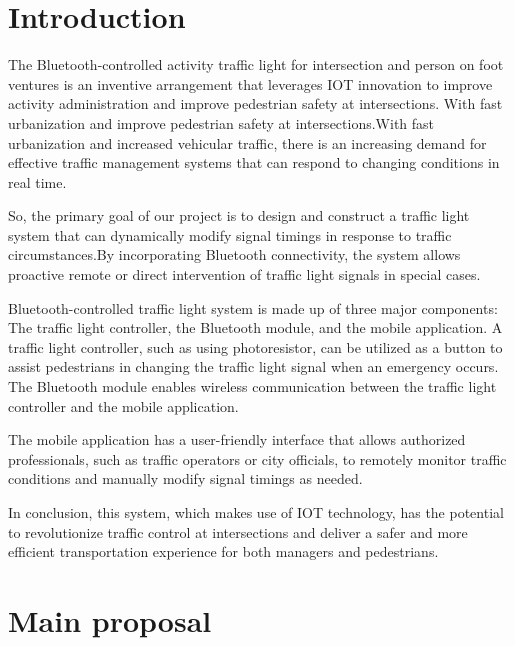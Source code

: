 \documentclass[conference, onecolumn]{IEEEtran}
\begin{document}
\section {\textbf{Introduction}}
The Bluetooth-controlled activity traffic light for intersection and person on foot ventures is an inventive arrangement that leverages IOT innovation to improve activity administration and improve pedestrian safety at intersections. With fast urbanization and improve pedestrian safety at intersections.With fast urbanization and increased vehicular traffic, there is an increasing demand for effective traffic management systems that can respond to changing conditions in real time.\par

So, the primary goal of our project is to design and construct a traffic light system that can dynamically modify signal timings in response to traffic circumstances.By incorporating Bluetooth connectivity, the system allows proactive remote or direct intervention of traffic light signals in special cases.\par

Bluetooth-controlled traffic light system is made up of three major components: The traffic light controller, the Bluetooth module, and the mobile application. A traffic light controller, such as using photoresistor, can be utilized as a button to assist pedestrians in changing the traffic light signal when an emergency occurs. The Bluetooth module enables wireless communication between the traffic light controller and the mobile application.\par
The mobile application has a user-friendly interface that allows authorized professionals, such as traffic operators or city officials, to remotely monitor traffic conditions and manually modify signal timings as needed.\par


In conclusion, this system, which makes use of IOT technology, has the potential to revolutionize traffic control at intersections and deliver a safer and more efficient transportation experience for both managers and pedestrians.\par


\section{Main proposal}
\end{document}

